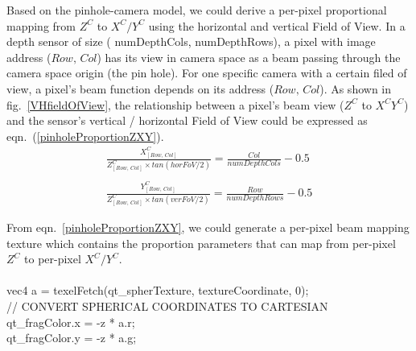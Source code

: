 Based on the pinhole-camera model, we could derive a per-pixel proportional mapping from \(Z^C\) to \(X^C/Y^C\) using the horizontal and vertical Field of View. In a depth sensor of size %
({\ttfamily
\textcolor[rgb]{0.5019608,0.0,0.0}{numDepthCols}\textcolor{black}{,}\textcolor[rgb]{0.7529412,0.7529412,0.7529412}{
}\textcolor[rgb]{0.5019608,0.0,0.0}{numDepthRows}}),
%
a pixel with image address (\(Row, \, Col\)) has its view in camera space as a beam passing through the camera space origin (the pin hole). For one specific camera with a certain filed of view, a pixel's beam function depends on its address (\(Row, \, Col\)). As shown in fig.~\ref{VHfieldOfView}, the relationship between a pixel's beam view (\(Z^C\) to \(X^CY^C\)) and the sensor's vertical / horizontal Field of View could be expressed as eqn.~(\ref{pinholeProportionZXY}).
%
\begin{equation}
\begin{aligned}
\frac{X^C_{[Row, \, Col]}}{Z^C_{[Row, \, Col]} \times tan(horFoV / 2)} 
=
			\frac{Col}{numDepthCols} - 0.5
\\\\%
\frac{Y^C_{[Row, \, Col]}}{Z^C_{[Row, \, Col]} \times tan(verFoV / 2)} 
=
			\frac{Row}{numDepthRows} - 0.5
\end{aligned}
\label{pinholeProportionZXY}
\end{equation}%

\noindent
From eqn.~\ref{pinholeProportionZXY}, we could generate a per-pixel beam mapping texture which contains the proportion parameters that can map from per-pixel \(Z^C\) to per-pixel \(X^C/Y^C\).
\\\\
        vec4  a = texelFetch(qt\_spherTexture, textureCoordinate, 0);\\
        // CONVERT SPHERICAL COORDINATES TO CARTESIAN\\
        qt\_fragColor.x = -z * a.r;\\
        qt\_fragColor.y = -z * a.g;\\\\








